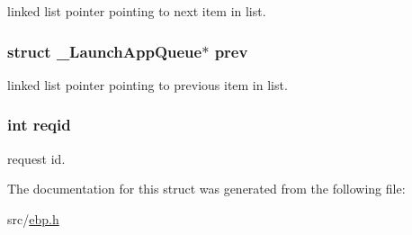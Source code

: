 linked list pointer pointing to next item in list. 

\hypertarget{struct___launch_app_queue_a6f9df1a0cb11dcb6a5938b0d7f80a124}{
\subsubsection[{prev}]{\setlength{\rightskip}{0pt plus 5cm}struct {\bf \-\_\-\-Launch\-App\-Queue}$\ast$ {\bf prev}}}\label{struct___launch_app_queue_a6f9df1a0cb11dcb6a5938b0d7f80a124}


linked list pointer pointing to previous item in list. 

\hypertarget{struct___launch_app_queue_a2358dbe4119c1a52c0dc643be9977af9}{
\subsubsection[{reqid}]{\setlength{\rightskip}{0pt plus 5cm}int {\bf reqid}}}\label{struct___launch_app_queue_a2358dbe4119c1a52c0dc643be9977af9}


request id. 



\-The documentation for this struct was generated from the following file\-:\begin{DoxyCompactItemize}
\item 
src/\hyperlink{ebp_8h}{ebp.\-h}\end{DoxyCompactItemize}
